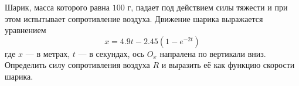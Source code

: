 Шарик, масса которого равна $100$ г, падает под действием силы тяжести
и при этом испытывает сопротивление воздуха.
Движение шарика выражается уравнением
$$x = 4.9t - 2.45(1 -e^{-2t})$$
где $x$ --- в метрах, $t$ --- в секундах, ось $O_x$ напралена по вертикали вниз.
Определить силу сопротивления воздуха $R$
и выразить её как функцию скорости шарика.
